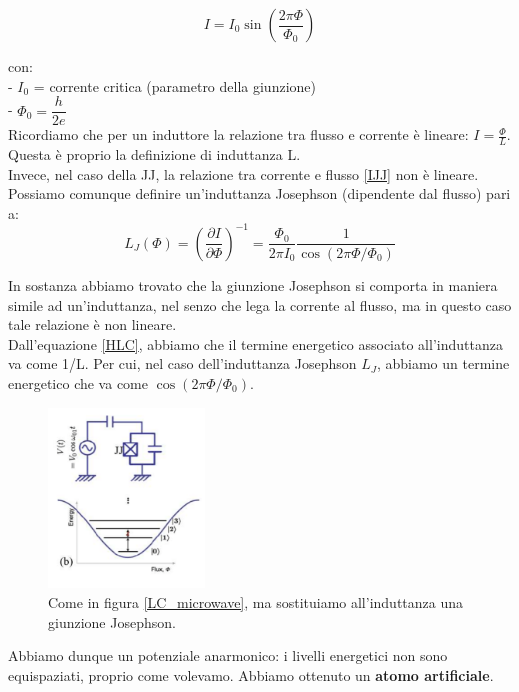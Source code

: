 \documentclass[10pt,a4paper]{article}
\begin{document}
\begin{equation}
I = I_0 \sin\left(\dfrac{2\pi\Phi}{\Phi_0}\right)
\label{IJJ}
\end{equation}

\noindent
con:\\
- $I_0$ = corrente critica (parametro della giunzione)\\
- $\Phi_0 = \dfrac{h}{2e}$\\

\noindent
Ricordiamo che per un induttore la relazione tra flusso e corrente è lineare: $I = \frac{\Phi}{L}$. Questa è proprio la definizione di induttanza L.\\

Invece, nel caso della JJ, la relazione tra corrente e flusso \eqref{IJJ} non è lineare. Possiamo comunque definire un'induttanza Josephson (dipendente dal flusso) pari a:
\begin{equation}
    L_J(\Phi) = \left(\dfrac{\partial I}{\partial \Phi}\right)^{-1} = \dfrac{\Phi_0}{2\pi I_0}\dfrac{1}{\cos{(2\pi\Phi/\Phi_0)}}
\end{equation}

In sostanza abbiamo trovato che la giunzione Josephson si comporta in maniera simile ad un'induttanza, nel senzo che lega la corrente al flusso, ma in questo caso tale relazione è non lineare.\\
Dall'equazione \eqref{HLC}, abbiamo che il termine energetico associato all'induttanza va come 1/L. Per cui, nel caso dell'induttanza Josephson $L_J$, abbiamo un termine energetico che va come $\cos{(2\pi\Phi/\Phi_0)}$.

\begin{figure}[h]
    \centering
    \includegraphics[width=0.37\textwidth]{JJ_energy.png}
    \caption{Come in figura \ref{LC_microwave}, ma sostituiamo all'induttanza una giunzione Josephson.}
    \label{JJ_energy}
\end{figure}
\FloatBarrier

Abbiamo dunque un potenziale anarmonico: i livelli energetici non sono equispaziati, proprio come volevamo. Abbiamo ottenuto un \textbf{atomo artificiale}.\\
\end{document}
